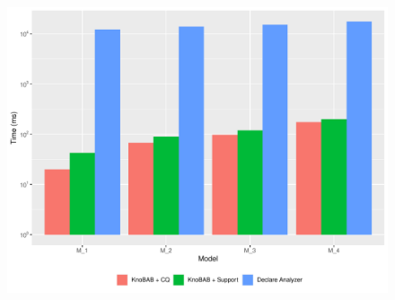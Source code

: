 \begin{figure}[!t]
		\centering
\includegraphics[width=.71\linewidth]{images/burattin_benchmark.pdf}
\label{fig:vsBuatto}
\end{figure}


